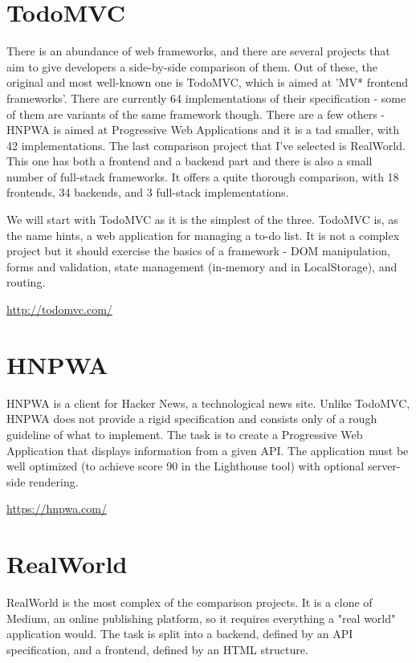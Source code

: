 \documentclass[english,odsaz]{fitthesis}
\begin{document}
\section{TodoMVC}
\label{sec:orgd2488c4}
There is an abundance of web frameworks, and there are several projects that aim
to give developers a side-by-side comparison of them. Out of these, the original
and most well-known one is TodoMVC, which is aimed at 'MV* frontend
frameworks'. There are currently 64 implementations of their specification -
some of them are variants of the same framework though. There are a few others -
HNPWA is aimed at Progressive Web Applications and it is a tad smaller, with 42
implementations. The last comparison project that I've selected is
RealWorld. This one has both a frontend and a backend part and there is also a
small number of full-stack frameworks. It offers a quite thorough comparison,
with 18 frontends, 34 backends, and 3 full-stack implementations.

We will start with TodoMVC as it is the simplest of the three. TodoMVC is, as
the name hints, a web application for managing a to-do list. It is not a complex
project but it should exercise the basics of a framework - DOM manipulation,
forms and validation, state management (in-memory and in LocalStorage), and
routing.

\url{http://todomvc.com/}

\section{HNPWA}
\label{sec:org7b32124}
HNPWA is a client for Hacker News, a technological news site. Unlike TodoMVC,
HNPWA does not provide a rigid specification and consists only of a rough
guideline of what to implement. The task is to create a Progressive Web
Application that displays information from a given API. The application must be
well optimized (to achieve score 90 in the Lighthouse tool) with optional
server-side rendering.

\url{https://hnpwa.com/}

\section{RealWorld}
\label{sec:org5221924}
RealWorld is the most complex of the comparison projects. It is a clone of
Medium, an online publishing platform, so it requires everything a "real world"
application would. The task is split into a backend, defined by an API
specification, and a frontend, defined by an HTML structure.
\end{document}
